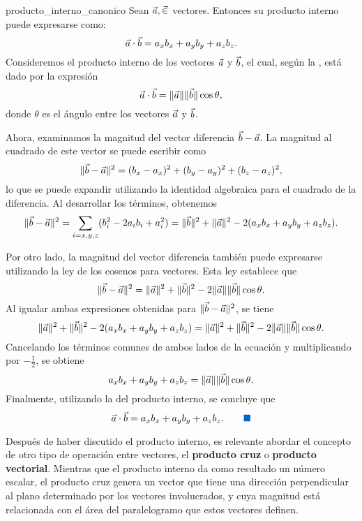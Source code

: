 \begin{theorem}{}{producto_interno_canonico}
    Sean $\vec{a}, \vec \in$ \RR[3] vectores. Entonces su producto interno puede expresarse como:
    $$\vec{a} \cdot \vec{b} = a_x b_x + a_y b_y + a_z b_z.$$
    \dem Consideremos el producto interno de los vectores $\vec{a}$ y $\vec{b}$, el cual, según la , está dado por la expresión
        $$\vec{a} \cdot \vec{b} = \|\vec{a}\| \|\vec{b}\| \cos \theta,$$
        donde $\theta$ es el ángulo entre los vectores $\vec{a}$ y $\vec{b}$.
        
        Ahora, examinamos la magnitud del vector diferencia $ \vec{b} - \vec{a} $. La magnitud al cuadrado de este vector se puede escribir como
        $$\|\vec{b} - \vec{a}\|^2 = (b_x - a_x)^2 + (b_y - a_y)^2 + (b_z - a_z)^2,$$
        lo que se puede expandir utilizando la identidad algebraica para el cuadrado de la diferencia. Al desarrollar los términos, obtenemos
        $$\|\vec{b} - \vec{a}\|^2 = \sum_{i=x,y,z} (b_i^2 - 2a_i b_i + a_i^2) = \|\vec{b}\|^2 + \|\vec{a}\|^2 - 2(a_x b_x + a_y b_y + a_z b_z).$$
        
        Por otro lado, la magnitud del vector diferencia también puede expresarse utilizando la ley de los cosenos para vectores. Esta ley establece que
        $$\|\vec{b} - \vec{a}\|^2 = \|\vec{a}\|^2 + \|\vec{b}\|^2 - 2 \|\vec{a}\| \|\vec{b}\| \cos \theta.$$
        Al igualar ambas expresiones obtenidas para $\|\vec{b} - \vec{a}\|^2$, se tiene
        $$\|\vec{a}\|^2 + \|\vec{b}\|^2 - 2(a_x b_x + a_y b_y + a_z b_z) = \|\vec{a}\|^2 + \|\vec{b}\|^2 - 2 \|\vec{a}\| \|\vec{b}\| \cos \theta.$$
        Cancelando los términos comunes de ambos lados de la ecuación y multiplicando por $-\frac{1}{2}$, se obtiene
        $$a_x b_x + a_y b_y + a_z b_z = \|\vec{a}\| \|\vec{b}\| \cos \theta.$$
        Finalmente, utilizando la  del producto interno, se concluye que
        \begin{equation*}
            \veca \cdot \vecb = a_x b_x + a_y b_y + a_z b_z. \tag*{\BlackSquare}
        \end{equation*}
\end{theorem}

Después de haber discutido el producto interno, es relevante abordar el concepto de otro tipo de operación entre vectores, el \textbf{producto cruz} o \textbf{producto vectorial}. Mientras que el producto interno da como resultado un número escalar, el producto cruz genera un vector que tiene una dirección perpendicular al plano determinado por los vectores involucrados, y cuya magnitud está relacionada con el área del paralelogramo que estos vectores definen.

